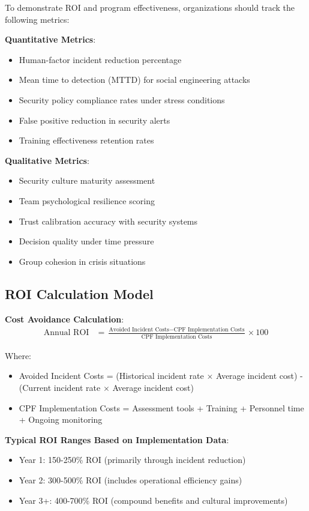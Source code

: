 \documentclass[11pt,a4paper]{article}
\begin{document}
To demonstrate ROI and program effectiveness, organizations should track the following metrics:

\textbf{Quantitative Metrics}:
\begin{itemize}
\item Human-factor incident reduction percentage
\item Mean time to detection (MTTD) for social engineering attacks
\item Security policy compliance rates under stress conditions
\item False positive reduction in security alerts
\item Training effectiveness retention rates
\end{itemize}

\textbf{Qualitative Metrics}:
\begin{itemize}
\item Security culture maturity assessment
\item Team psychological resilience scoring
\item Trust calibration accuracy with security systems
\item Decision quality under time pressure
\item Group cohesion in crisis situations
\end{itemize}

\subsection{ROI Calculation Model}

\textbf{Cost Avoidance Calculation}:
\begin{align}
\text{Annual ROI} &= \frac{\text{Avoided Incident Costs} - \text{CPF Implementation Costs}}{\text{CPF Implementation Costs}} \times 100
\end{align}

Where:
\begin{itemize}
\item Avoided Incident Costs = (Historical incident rate $\times$ Average incident cost) - (Current incident rate $\times$ Average incident cost)
\item CPF Implementation Costs = Assessment tools + Training + Personnel time + Ongoing monitoring
\end{itemize}

\textbf{Typical ROI Ranges Based on Implementation Data}:
\begin{itemize}
\item Year 1: 150-250\% ROI (primarily through incident reduction)
\item Year 2: 300-500\% ROI (includes operational efficiency gains)
\item Year 3+: 400-700\% ROI (compound benefits and cultural improvements)
\end{itemize}
\end{document}

